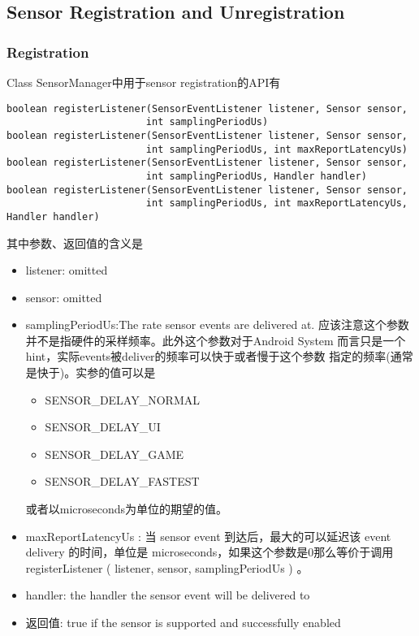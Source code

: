 {\subsection{Sensor Registration and Unregistration}
\subsubsection{Registration}
Class SensorManager中用于sensor registration的API有
\begin{lstlisting}
boolean registerListener(SensorEventListener listener, Sensor sensor,
                        int samplingPeriodUs)
boolean registerListener(SensorEventListener listener, Sensor sensor,
                        int samplingPeriodUs, int maxReportLatencyUs)
boolean registerListener(SensorEventListener listener, Sensor sensor,
                        int samplingPeriodUs, Handler handler)
boolean registerListener(SensorEventListener listener, Sensor sensor,
                        int samplingPeriodUs, int maxReportLatencyUs, Handler handler)
\end{lstlisting}
其中参数、返回值的含义是
\begin{itemize}
  \item listener: omitted
  \item sensor: omitted
  \item samplingPeriodUs:The rate sensor events are delivered at. 
    应该注意这个参数并不是指硬件的采样频率。此外这个参数对于Android System
    而言只是一个hint，实际events被deliver的频率可以快于或者慢于这个参数
    指定的频率(通常是快于)。实参的值可以是
      \begin{itemize}
        \item SENSOR\_DELAY\_NORMAL
        \item SENSOR\_DELAY\_UI
        \item SENSOR\_DELAY\_GAME
        \item SENSOR\_DELAY\_FASTEST
      \end{itemize}
      或者以microseconds为单位的期望的值。
  \item maxReportLatencyUs : 当 sensor event 到达后，最大的可以延迟该 event delivery
    的时间，单位是 microseconds，如果这个参数是0那么等价于调用
    registerListener ( listener, sensor, samplingPeriodUs ) 。
  \item handler: the handler the sensor event will be delivered to
  \item 返回值: true if the sensor is supported and successfully enabled
\end{itemize}

}

